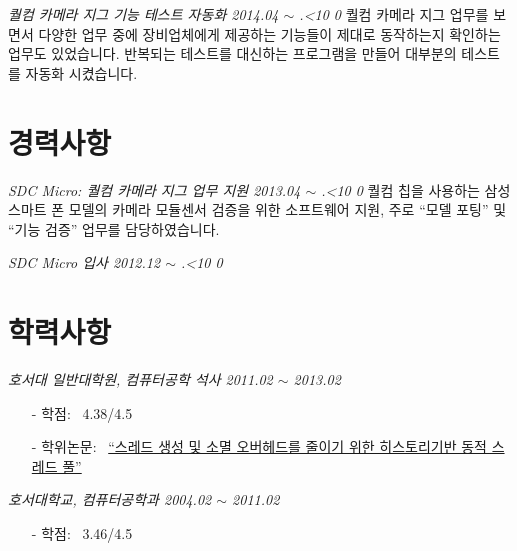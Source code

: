 \documentclass[line,margin]{res}
\renewcommand{\today}{\number\year.\ifnum\number\month<10 0\fi \number\month}
\begin{document}
\begin{resume}
  {\sl 퀄컴 카메라 지그 기능 테스트 자동화 \hfill 2014.04 $\sim$ \today}
  \vspace{1mm}
  \newline
  {
    \small
    퀄컴 카메라 지그 업무를 보면서 다양한 업무 중에 장비업체에게 제공하는 기능들이 제대로 동작하는지 확인하는
    업무도 있었습니다. 반복되는 테스트를 대신하는 프로그램을 만들어 대부분의 테스트를 자동화 시켰습니다.
  }


  \section{경력사항}

  {\sl SDC Micro: 퀄컴 카메라 지그 업무 지원 \hfill 2013.04 $\sim$ \today}
  \vspace{1mm}
  \newline
  {
    \small
    퀄컴 칩을 사용하는 삼성 스마트 폰 모델의 카메라 모듈센서 검증을 위한 소프트웨어 지원,
    주로 ``모델 포팅'' 및 ``기능 검증'' 업무를 담당하였습니다.
  }

  {\sl SDC Micro 입사 \hfill 2012.12 $\sim$ \today}
  \vspace{0mm}


  \section{학력사항}

  {\sl 호서대 일반대학원, 컴퓨터공학 석사 \hfill 2011.02 $\sim$ 2013.02}
  \vspace{-4mm}
  {
    \small
    \begin{itemize}
    \item[-] 학점: ~4.38/4.5 \vspace{-1mm}
    \item[-] 학위논문: ~\href{http://dlibrary.hoseo.ac.kr/search/DetailView.ax?sid=4&cid=950591}
      {``스레드 생성 및 소멸 오버헤드를 줄이기 위한 히스토리기반 동적 스레드 풀''}
    \end{itemize}
  }

  {\sl 호서대학교, 컴퓨터공학과 \hfill 2004.02 $\sim$ 2011.02}
  \vspace{-4mm}
  {
    \small
    \begin{itemize}
    \item[-] 학점: ~3.46/4.5
    \end{itemize}
  }


\end{resume}

\end{document}
